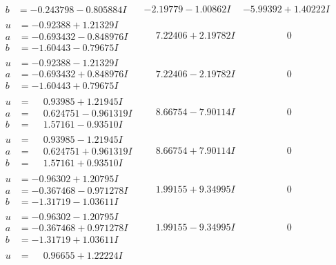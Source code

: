 \documentclass[1p]{elsarticle_modified}
\theoremstyle{definition}
\begin{document}
$$\begin{array}{c|c|c}
\begin{aligned}
b &= -0.243798 - 0.805884 I\end{aligned}
 & -2.19779 - 1.00862 I & -5.99392 + 1.40222 I \\ \hline\begin{aligned}
u &= -0.92388 + 1.21329 I \\
a &= -0.693432 - 0.848976 I \\
b &= -1.60443 - 0.79675 I\end{aligned}
 & \phantom{-}7.22406 + 2.19782 I & \phantom{-0.000000 } 0 \\ \hline\begin{aligned}
u &= -0.92388 - 1.21329 I \\
a &= -0.693432 + 0.848976 I \\
b &= -1.60443 + 0.79675 I\end{aligned}
 & \phantom{-}7.22406 - 2.19782 I & \phantom{-0.000000 } 0 \\ \hline\begin{aligned}
u &= \phantom{-}0.93985 + 1.21945 I \\
a &= \phantom{-}0.624751 - 0.961319 I \\
b &= \phantom{-}1.57161 - 0.93510 I\end{aligned}
 & \phantom{-}8.66754 - 7.90114 I & \phantom{-0.000000 } 0 \\ \hline\begin{aligned}
u &= \phantom{-}0.93985 - 1.21945 I \\
a &= \phantom{-}0.624751 + 0.961319 I \\
b &= \phantom{-}1.57161 + 0.93510 I\end{aligned}
 & \phantom{-}8.66754 + 7.90114 I & \phantom{-0.000000 } 0 \\ \hline\begin{aligned}
u &= -0.96302 + 1.20795 I \\
a &= -0.367468 - 0.971278 I \\
b &= -1.31719 - 1.03611 I\end{aligned}
 & \phantom{-}1.99155 + 9.34995 I & \phantom{-0.000000 } 0 \\ \hline\begin{aligned}
u &= -0.96302 - 1.20795 I \\
a &= -0.367468 + 0.971278 I \\
b &= -1.31719 + 1.03611 I\end{aligned}
 & \phantom{-}1.99155 - 9.34995 I & \phantom{-0.000000 } 0 \\ \hline\begin{aligned}
u &= \phantom{-}0.96655 + 1.22224 I \\

\end{aligned}
\end{array}$$
\end{document}
